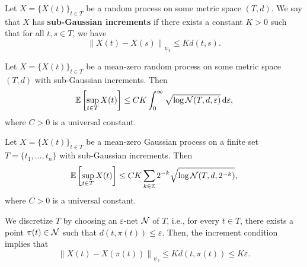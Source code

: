 \begin{definition}
    Let \(X=\{X(t)\}_{t\in T}\) be a random process on some metric space \((T,d)\). We say that \(X\) has \textbf{sub-Gaussian increments} if there exists a constant \(K>0\) such that for all \(t,s\in T\), we have
    \begin{equation*}
        \left\|X(t)-X(s)\right\|_{\psi_{2}}\leq Kd(t,s).
    \end{equation*}
\end{definition}

\begin{theorem}
    Let \(X=\{X(t)\}_{t\in T}\) be a mean-zero random process on some metric space \((T,d)\) with sub-Gaussian increments. Then
    \begin{equation*}
        {\mathbb E}\left[\sup_{t\in T}X(t)\right]\leq CK\int_{0}^{\infty}\sqrt{\log{\mathcal N}(T,d,\varepsilon)}\mathop{}\!\mathrm{d}\varepsilon,
    \end{equation*}
    where \(C>0\) is a universal constant.
\end{theorem}

\begin{theorem}
    Let \(X=\{X(t)\}_{t\in T}\) be a mean-zero Gaussian process on a finite set \(T=\{t_{1},\ldots,t_{n}\}\) with sub-Gaussian increments. Then
    \begin{equation*}
        {\mathbb E}\left[\sup_{t\in T}X(t)\right]\leq CK\sum_{k\in{\mathbb Z}}2^{-k}\sqrt{\log{\mathcal N}(T,d,2^{-k})},
    \end{equation*}
    where \(C>0\) is a universal constant.
\end{theorem}

We discretize \(T\) by choosing an \(\varepsilon\)-net \({\mathcal N}\) of \(T\), i.e., for every \(t\in T\), there exists a point \(\pi(t)\in{\mathcal N}\) such that \(d(t,\pi(t))\leq\varepsilon\). Then, the increment condition implies that
\begin{equation*}
    \left\|X(t)-X(\pi(t))\right\|_{\psi_{2}}\leq Kd(t,\pi(t))\leq K\varepsilon.
\end{equation*}

